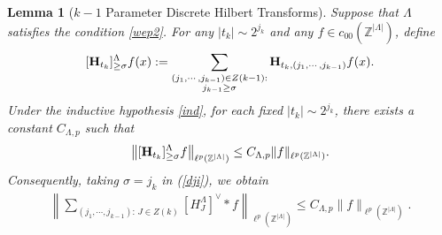 \documentclass[11 pt,letterpaper]{amsart}
\theoremstyle{plain}
\newtheorem{lemma}{Lemma}\numberwithin{lemma}{section}
\theoremstyle{definition}
\theoremstyle{remark} \theoremstyle{exam} \theoremstyle{ob}
\numberwithin{equation}{section}
\begin{document}
\begin{lemma}[$k\!-\!1$ Parameter Discrete Hilbert Transforms]\label{ii11}
Suppose that $\Lambda$ satisfies the condition   \eqref{wep2}. For any $|t_k|\sim 2^{j_k}$ and any $f\in c_{00}(\mathbb{Z}^{|\Lambda|})$, define
\begin{align}\label{34m}
[{\bf H}_{t_k}]^{\Lambda}_{\ge \sigma}f(x)
:=
\sum_{\substack{(j_1,\cdots,j_{k-1})\in Z(k-1):\\ j_{k-1}\ge \sigma}}
{\bf H}_{t_k,(j_1,\cdots,j_{k-1})}f(x).
\end{align}
Under the inductive hypothesis \eqref{ind}, for each fixed  $|t_k|\sim 2^{j_k}$, there exists a constant $C_{\Lambda,p}$ such that
\begin{align}\label{dji}
\left\| [{\bf H}_{t_k}]^{\Lambda}_{\ge \sigma}f \right\|_{\ell^p(\mathbb{Z}^{|\Lambda|})}
\le C_{\Lambda,p}\|f\|_{\ell^p(\mathbb{Z}^{|\Lambda|})}.
\end{align}
Consequently, taking $\sigma=j_k$ in (\ref{dji}), we obtain
\begin{align}\label{9nn2}
\left\|   
\sum_{(j_1,\cdots,j_{k-1}):\, J\in Z(k)}
[H_J^{\Lambda}]^{\vee}*f
\right\|_{\ell^p(\mathbb{Z}^{|\Lambda|})}
\le C_{\Lambda,p} \|f\|_{\ell^p(\mathbb{Z}^{|\Lambda|})}.
\end{align}
\end{lemma}



 
\end{document}
